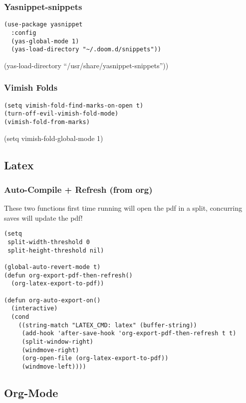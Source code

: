 \documentclass[11pt]{article}
\begin{document}
\subsubsection{Yasnippet-snippets}
\label{sec:org367120f}
\begin{verbatim}
(use-package yasnippet
  :config
  (yas-global-mode 1)
  (yas-load-directory "~/.doom.d/snippets"))
\end{verbatim}
(yas-load-directory ``/usr/share/yasnippet-snippets''))
\subsubsection{Vimish Folds}
\label{sec:orgfb58292}
\begin{verbatim}
(setq vimish-fold-find-marks-on-open t)
(turn-off-evil-vimish-fold-mode)
(vimish-fold-from-marks)
\end{verbatim}
(setq vimish-fold-global-mode 1)
\subsection{Latex}
\label{sec:org4706b94}
\subsubsection{Auto-Compile + Refresh (from org)}
\label{sec:org9473bb8}
These two functions first time running will open the pdf in a split, concurring saves will update the pdf!
\begin{verbatim}
(setq
 split-width-threshold 0
 split-height-threshold nil)

(global-auto-revert-mode t)
(defun org-export-pdf-then-refresh()
  (org-latex-export-to-pdf))

(defun org-auto-export-on()
  (interactive)
  (cond
    ((string-match "LATEX_CMD: latex" (buffer-string))
     (add-hook 'after-save-hook 'org-export-pdf-then-refresh t t)
     (split-window-right)
     (windmove-right)
     (org-open-file (org-latex-export-to-pdf))
     (windmove-left))))
\end{verbatim}
\subsection{Org-Mode}
\label{sec:org0ece85e}
\end{document}
